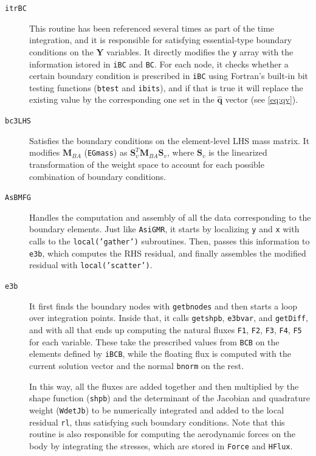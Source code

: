 \documentclass{ucb}
\begin{document}
\begin{description}

    \item[\texttt{itrBC}] This routine has been referenced several times as part of the time integration, and it is responsible for satisfying essential-type boundary conditions on the $\bm{Y}$ variables. It directly modifies the \texttt{y} array with the information istored in \texttt{iBC} and \texttt{BC}. For each node, it checks whether a certain boundary condition is prescribed in \texttt{iBC} using Fortran's built-in bit testing functions (\texttt{btest} and \texttt{ibits}), and if that is true it will replace the existing value by the corresponding one set in the $\bm{\hat{q}}$ vector (see \autoref{eq:qv}).
    
    \item[\texttt{bc3LHS}] Satisfies the boundary conditions on the element-level LHS mass matrix. It modifies $\bm{M}_{BA}$ (\texttt{EGmass}) as $\bm{S}_v^T\bm{M}_{BA}\bm{S}_v$, where $\bm{S}_v$ is the linearized transformation of the weight space to account for each possible combination of boundary conditions.
    
    \item[\texttt{AsBMFG}] Handles the computation and assembly of all the data corresponding to the boundary elements. Just like \texttt{AsiGMR}, it starts by localizing \texttt{y} and \texttt{x} with calls to the \texttt{local('gather')} subroutines. Then, passes this information to \texttt{e3b}, which computes the RHS residual, and finally assembles the modified residual with \texttt{local('scatter')}.
    
    \item[\texttt{e3b}] It first finds the boundary nodes with \texttt{getbnodes} and then starts a loop over integration points. Inside that, it calls \texttt{getshpb}, \texttt{e3bvar}, and \texttt{getDiff}, and with all that ends up computing the natural fluxes \texttt{F1}, \texttt{F2}, \texttt{F3}, \texttt{F4}, \texttt{F5} for each variable. These take the prescribed values from \texttt{BCB} on the elements defined by \texttt{iBCB}, while the floating flux is computed with the current solution vector and the normal \texttt{bnorm} on the rest.
    
    In this way, all the fluxes are added together and then multiplied by the shape function (\texttt{shpb}) and the determinant of the Jacobian and quadrature weight (\texttt{WdetJb}) to be numerically integrated and added to the local residual \texttt{rl}, thus satisfying such boundary conditions. Note that this routine is also responsible for computing the aerodynamic forces on the body by integrating the stresses, which are stored in \texttt{Force} and \texttt{HFlux}.
        

\end{description}
\end{document}

